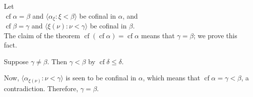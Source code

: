 \documentclass[12pt]{article}
\begin{document}
Let \\

$\operatorname{cf} \alpha=\beta$ and $\langle\alpha_\xi:\xi<\beta\rangle$ be cofinal in $\alpha$, and \\

$\operatorname{cf} \beta=\gamma$ and $\langle\xi(\nu):\nu<\gamma\rangle$ be cofinal in $\beta$. \\

The claim of the theorem $\operatorname{cf}(\operatorname{cf} \alpha) = \operatorname{cf} \alpha$ means that $\gamma=\beta$; we prove this fact.

Suppose $\gamma\neq\beta$. Then $\gamma<\beta$ by $\operatorname{cf}\delta\leq\delta$.

Now, $\langle\alpha_{\xi(\nu)}:\nu<\gamma\rangle$ is seen to be confinal in $\alpha$, which means that $\operatorname{cf}\alpha=\gamma<\beta$, a contradiction. Therefore, $\gamma=\beta$.
\end{document}
